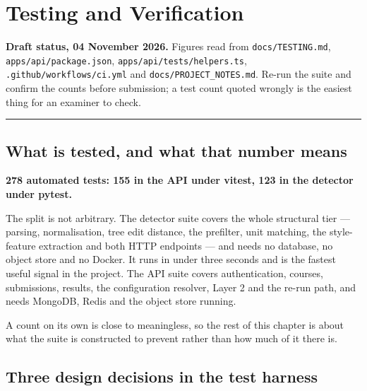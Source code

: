 \hypertarget{testing-and-verification}{%
\chapter{Testing and Verification}\label{testing-and-verification}}

\begin{draftnote}

\textbf{Draft status, 04 November 2026.} Figures read from
\texttt{docs/TESTING.md}, \texttt{apps/api/package.json},
\texttt{apps/api/tests/helpers.ts}, \texttt{.github/workflows/ci.yml}
and \texttt{docs/PROJECT\_NOTES.md}. Re-run the suite and confirm the
counts before submission; a test count quoted wrongly is the easiest
thing for an examiner to check.

\end{draftnote}

\begin{center}\rule{0.5\linewidth}{0.5pt}\end{center}

\hypertarget{what-is-tested-and-what-that-number-means}{%
\section{What is tested, and what that number
means}\label{what-is-tested-and-what-that-number-means}}

\textbf{278 automated tests: 155 in the API under vitest, 123 in the
detector under pytest.}

The split is not arbitrary. The detector suite covers the whole
structural tier --- parsing, normalisation, tree edit distance, the
prefilter, unit matching, the style-feature extraction and both HTTP
endpoints --- and needs no database, no object store and no Docker. It
runs in under three seconds and is the fastest useful signal in the
project. The API suite covers authentication, courses, submissions,
results, the configuration resolver, Layer 2 and the re-run path, and
needs MongoDB, Redis and the object store running.

A count on its own is close to meaningless, so the rest of this chapter
is about what the suite is constructed to prevent rather than how much
of it there is.

\hypertarget{three-design-decisions-in-the-test-harness}{%
\section{Three design decisions in the test
harness}\label{three-design-decisions-in-the-test-harness}}

